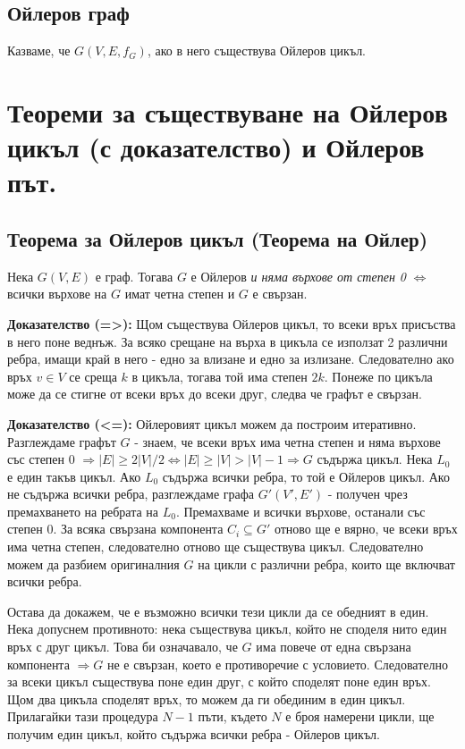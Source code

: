 \documentclass[fleqn,12pt]{article}
\begin{document}
\begin{flushleft}
\subsection{Ойлеров граф} 
Казваме, че $G(V,E,f_G)$, ако в него съществува Ойлеров цикъл.

\section{Теореми за съществуване на Ойлеров цикъл (с доказателство) и Ойлеров път.}

\subsection{Теорема за Ойлеров цикъл (Теорема на Ойлер)} 
Нека $G(V,E)$ е граф. Тогава $G$ е Ойлеров \textit{и няма върхове от степен 0} $\Leftrightarrow$
всички върхове на $G$ имат четна степен и $G$ е свързан.

\textbf{Доказателство (=>): } Щом съществува Ойлеров цикъл, то всеки връх присъства в него поне веднъж.
За всяко срещане на върха в цикъла се използат 2 различни ребра, имащи край в него - едно за влизане и едно за излизане.
Следователно ако връх $v \in V$ се среща $k$ в цикъла, тогава той има степен $2k$. Понеже по цикъла може да се стигне от
всеки връх до всеки друг, следва че графът е свързан.
\vspace{10mm}

\textbf{Доказателство (<=): } Ойлеровият цикъл можем да построим итеративно. Разглеждаме графът $G$ - знаем, че всеки връх има четна степен и
няма върхове със степен 0 $\Rightarrow |E| \geq 2 |V| / 2 \Leftrightarrow |E| \geq |V| > |V| - 1 \Rightarrow G$ съдържа цикъл.  
Нека $L_0$ е един такъв цикъл. Ако $L_0$ съдържа всички ребра, то той е Ойлеров цикъл. 
Ако не съдържа всички ребра, разглеждаме графа $G'(V', E')$ - получен чрез премахването на ребрата на $L_0$. 
Премахваме и всички върхове, останали със степен 0. За всяка свързана компонента $C_i \subseteq G'$ отново ще е вярно,
че всеки връх има четна степен, следователно отново ще съществува цикъл. Следователно можем да разбием оригиналния
$G$ на цикли с различни ребра, които ще включват всички ребра. 

Остава да докажем, че е възможно всички тези цикли да се обедният в един. Нека допуснем противното: нека съществува цикъл,
който не споделя нито един връх с друг цикъл. Това би означавало, че $G$ има повече от една свързана компонента 
$\Rightarrow G$ не е свързан, което е противоречие с условието. Следователно за всеки цикъл съществува поне един друг,
с който споделят поне един връх. Щом два цикъла споделят връх, то можем да ги обединим в един цикъл. Прилагайки тази процедура
$N - 1$ пъти, където $N$ е броя намерени цикли, ще получим един цикъл, който съдържа всички ребра - Ойлеров цикъл. 
\vspace{10mm}


\end{flushleft}
\end{document}
